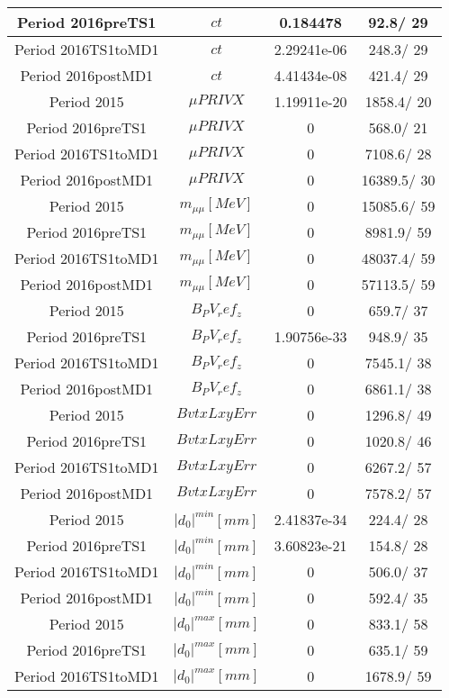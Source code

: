 \documentclass{article}
\begin{document}
\begin{longtable}{c|c|c|c}
\hline
 Period 2016preTS1 & $ct$ & 0.184478 &  92.8/ 29\\
\hline
 Period 2016TS1toMD1 & $ct$ & 2.29241e-06 & 248.3/ 29\\
\hline
 Period 2016postMD1 & $ct$ & 4.41434e-08 & 421.4/ 29\\
\hline
 Period 2015 & $\mu PRIVX$ & 1.19911e-20 & 1858.4/ 20\\
\hline
 Period 2016preTS1 & $\mu PRIVX$ & 0 & 568.0/ 21\\
\hline
 Period 2016TS1toMD1 & $\mu PRIVX$ & 0 & 7108.6/ 28\\
\hline
 Period 2016postMD1 & $\mu PRIVX$ & 0 & 16389.5/ 30\\
\hline
 Period 2015 & $m_{\mu\mu} [MeV]$ & 0 & 15085.6/ 59\\
\hline
 Period 2016preTS1 & $m_{\mu\mu} [MeV]$ & 0 & 8981.9/ 59\\
\hline
 Period 2016TS1toMD1 & $m_{\mu\mu} [MeV]$ & 0 & 48037.4/ 59\\
\hline
 Period 2016postMD1 & $m_{\mu\mu} [MeV]$ & 0 & 57113.5/ 59\\
\hline
 Period 2015 & $B_PV_ref_z$ & 0 & 659.7/ 37\\
\hline
 Period 2016preTS1 & $B_PV_ref_z$ & 1.90756e-33 & 948.9/ 35\\
\hline
 Period 2016TS1toMD1 & $B_PV_ref_z$ & 0 & 7545.1/ 38\\
\hline
 Period 2016postMD1 & $B_PV_ref_z$ & 0 & 6861.1/ 38\\
\hline
 Period 2015 & $BvtxLxyErr$ & 0 & 1296.8/ 49\\
\hline
 Period 2016preTS1 & $BvtxLxyErr$ & 0 & 1020.8/ 46\\
\hline
 Period 2016TS1toMD1 & $BvtxLxyErr$ & 0 & 6267.2/ 57\\
\hline
 Period 2016postMD1 & $BvtxLxyErr$ & 0 & 7578.2/ 57\\
\hline
 Period 2015 & $|d_{0}|^{min} [mm]$ & 2.41837e-34 & 224.4/ 28\\
\hline
 Period 2016preTS1 & $|d_{0}|^{min} [mm]$ & 3.60823e-21 & 154.8/ 28\\
\hline
 Period 2016TS1toMD1 & $|d_{0}|^{min} [mm]$ & 0 & 506.0/ 37\\
\hline
 Period 2016postMD1 & $|d_{0}|^{min} [mm]$ & 0 & 592.4/ 35\\
\hline
 Period 2015 & $|d_{0}|^{max} [mm]$ & 0 & 833.1/ 58\\
\hline
 Period 2016preTS1 & $|d_{0}|^{max} [mm]$ & 0 & 635.1/ 59\\
\hline
 Period 2016TS1toMD1 & $|d_{0}|^{max} [mm]$ & 0 & 1678.9/ 59\\

\end{longtable}
\end{document}
